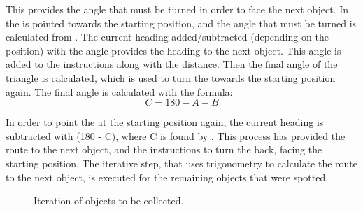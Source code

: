 This provides the angle that must be turned in order to face the next object. In  the \projname{} is pointed towards the starting position, and the angle that must be turned is calculated from . The current heading added/subtracted (depending on the position) with the angle provides the heading to the next object. This angle is added to the instructions along with the distance. Then the final angle of the triangle is calculated, which is used to turn the \projname{} towards the starting position again. The final angle is calculated with the formula:
\begin{equation}
C = 180 - A - B \label{equation:C}
\end{equation}

In order to point the \projname{} at the starting position again, the current heading is subtracted with (180 - C), where C is found by . This process has provided the route to the next object, and the instructions to turn the \projname{} back, facing the starting position.  The iterative step, that uses trigonometry to calculate the route to the next object, is executed for the remaining objects that were spotted.

\begin{figure}[H]
     \caption{\label{fig:object_navigation_iteration} Iteration of objects to be collected.}
\end{figure}


